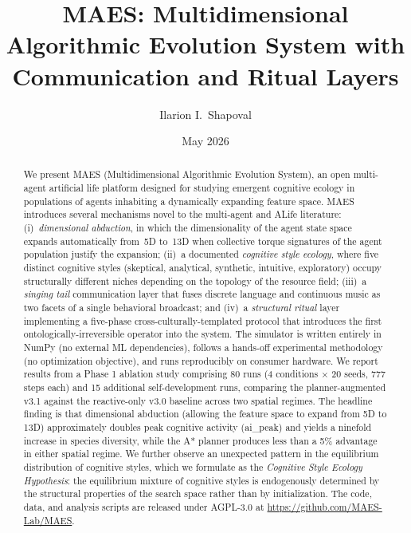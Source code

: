 \documentclass[11pt,a4paper]{article}
\title{MAES: Multidimensional Algorithmic Evolution System with\\
       Communication and Ritual Layers}
\author{Ilarion I.~Shapoval}
\affil{Independent Researcher}
\date{May 2026}
\begin{document}
\maketitle

\begin{abstract}
We present MAES (Multidimensional Algorithmic Evolution System), an open
multi-agent artificial life platform designed for studying emergent
cognitive ecology in populations of agents inhabiting a dynamically
expanding feature space. MAES introduces several mechanisms novel to the
multi-agent and ALife literature: (i)~\emph{dimensional abduction}, in
which the dimensionality of the agent state space expands automatically
from~5D to~13D when collective torque signatures of the agent population
justify the expansion; (ii)~a documented \emph{cognitive style ecology},
where five distinct cognitive styles (skeptical, analytical, synthetic,
intuitive, exploratory) occupy structurally different niches depending on
the topology of the resource field; (iii)~a \emph{singing tail}
communication layer that fuses discrete language and continuous music as
two facets of a single behavioral broadcast; and (iv)~a \emph{structural
ritual} layer implementing a five-phase cross-culturally-templated
protocol that introduces the first ontologically-irreversible operator
into the system. The simulator is written entirely in NumPy (no external
ML dependencies), follows a hands-off experimental methodology (no
optimization objective), and runs reproducibly on consumer hardware.
We report results from a Phase 1 ablation study comprising 80 runs
(4 conditions $\times$ 20 seeds, 777 steps each) and 15 additional
self-development runs, comparing the planner-augmented v3.1 against
the reactive-only v3.0 baseline across two spatial regimes. The headline
finding is that dimensional abduction (allowing the feature space to
expand from 5D to 13D) approximately doubles peak cognitive activity
(ai\_peak) and yields a ninefold increase in species diversity, while
the A* planner produces less than a 5\% advantage in either spatial
regime. We further observe an unexpected pattern in the equilibrium
distribution of cognitive styles, which we formulate as the
\emph{Cognitive Style Ecology Hypothesis}: the equilibrium mixture of
cognitive styles is endogenously determined by the structural
properties of the search space rather than by initialization.
The code, data, and analysis scripts are released under AGPL-3.0 at
\url{https://github.com/MAES-Lab/MAES}.
\end{abstract}
\end{document}
